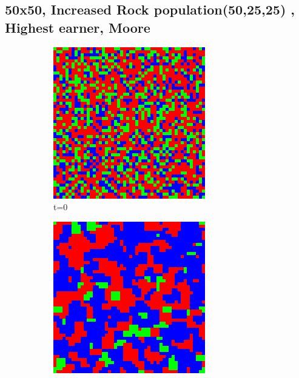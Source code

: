 \documentclass[a4paper, 11pt]{article}
\begin{document}
\newpage
\begin{landscape}
\subsection{50x50, Increased Rock population(50,25,25) , Highest earner, Moore}

\begin{figure}[H]
\centering
\begin{subfigure}{.20\textwidth}
  \centering
  \includegraphics[width=0.95\linewidth]{ROCK_PAPER_SCISSORS_MOORE_50x50_HighRockPop50_t00}
  \caption{t=0}
\end{subfigure}%
\begin{subfigure}{.20\textwidth}
  \centering
  \includegraphics[width=0.95\linewidth]{ROCK_PAPER_SCISSORS_MOORE_50x50_HighRockPop50_t01}

\end{subfigure}
\end{figure}
\end{landscape}
\end{document}
